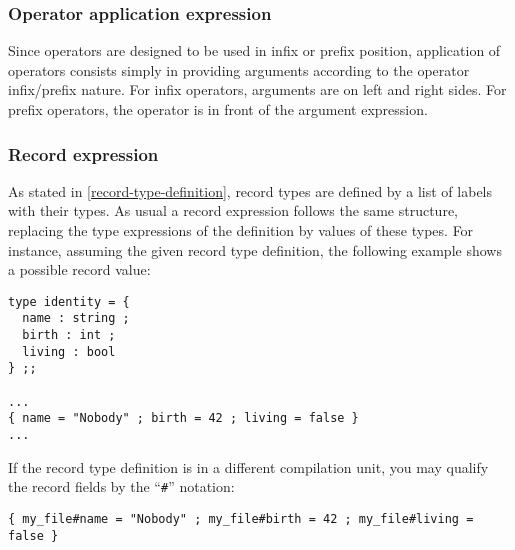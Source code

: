 \subsubsection{Operator application expression}
Since operators are designed to be used in infix or prefix position,
application of operators consists simply in providing arguments
according to the operator infix/prefix nature. For infix operators,
arguments are on left and right sides. For prefix operators, the
operator is in front of the argument expression.



\subsubsection{Record expression}
\label{record-expression}
As stated in \ref{record-type-definition},
record types are defined by a list of labels with their types. As
usual a record
expression follows the same structure, replacing the type expressions
of the definition by values of these types. For instance, assuming the
given record type definition, the following example shows a possible
record value:
{\scriptsize
\begin{lstlisting}
type identity = {
  name : string ;
  birth : int ;
  living : bool
} ;;

...
{ name = "Nobody" ; birth = 42 ; living = false }
...
\end{lstlisting}
}
If the record type definition is in a different compilation unit, you
may qualify the record fields by the ``{\tt\#}'' notation:
{\scriptsize
\begin{lstlisting}
{ my_file#name = "Nobody" ; my_file#birth = 42 ; my_file#living = false }
\end{lstlisting}
}



